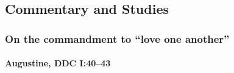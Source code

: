 		
	
	
	
	
\subsection{Commentary and Studies} %
	\label{LOVE-COMMENTARY}

	
		
	\subsubsection{On the commandment to ``love one another''}
		\label{LOVE-another}
		
		\paragraph{Augustine, DDC I:40--43}
		
